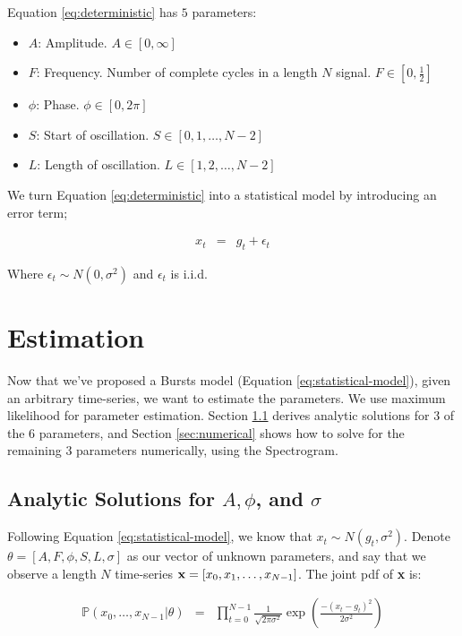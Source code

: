 \documentclass[11pt]{article}
\theoremstyle{plain}
\theoremstyle{definition}
\begin{document}
\noindent Equation \ref{eq:deterministic} has $5$ parameters:

\begin{itemize}
\setlength\itemsep{.1em}
	\item $A$: Amplitude. $A \in [0, \infty]$
	\item $F$: Frequency. Number of complete cycles in a length $N$ signal. $F \in [0, \frac{1}{2}]$
	\item $\phi$: Phase. $\phi \in [0, 2 \pi]$
	\item $S$: Start of oscillation. $S \in [0, 1, \ldots, N - 2]$
	\item $L$: Length of oscillation. $L \in [1, 2, \ldots, N - 2]$
\end{itemize}

\noindent We turn Equation \ref{eq:deterministic} into a statistical model by introducing an error term;

\begin{eqnarray}
\label{eq:statistical-model}
x_t &=& g_t + \epsilon_t 
\end{eqnarray}

\noindent Where $\epsilon_t \sim N(0, \sigma^2)$ and $\epsilon_t$ is i.i.d.

\section{Estimation}
\label{sec:estimation}
Now that we've proposed a Bursts model (Equation \ref{eq:statistical-model}), given an arbitrary time-series, we want to estimate the parameters. We use maximum likelihood for parameter estimation. Section \ref{sec:analytic} derives analytic solutions for 3 of the 6 parameters, and Section \ref{sec:numerical} shows how to solve for the remaining 3 parameters numerically, using the Spectrogram. 

\subsection{Analytic Solutions for $A, \phi$, and $\sigma$}
\label{sec:analytic}

Following Equation \ref{eq:statistical-model}, we know that $x_t \sim N(g_t, \sigma^2)$. Denote $\theta = [A, F, \phi, S, L, \sigma]$ as our vector of unknown parameters, and say that we observe a length $N$ time-series ${\bf x} = [x_0, x_1, \ldots, x_{N - 1}]$. The joint pdf of {\bf x} is:

\begin{eqnarray}
\label{eq:jointpdf}
	\mathbb{P}(x_0, \ldots, x_{N - 1} | \theta) &=& \prod_{t=0}^{N-1} \frac{1}{\sqrt{2 \pi \sigma^2}} \exp(\frac{-(x_t - g_t)^2}{2 \sigma^2})
\end{eqnarray}
\end{document}
